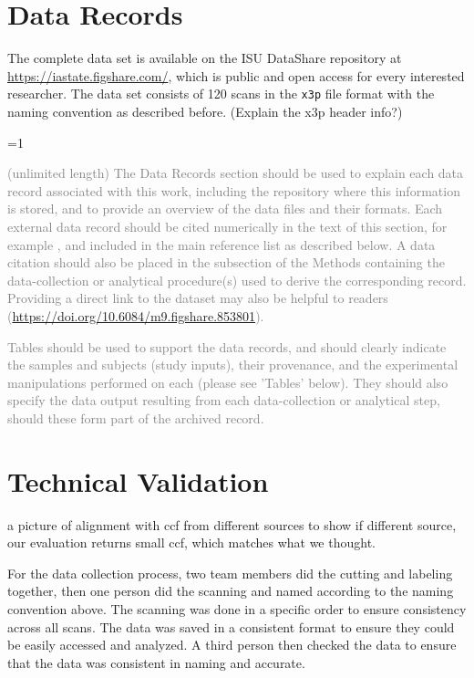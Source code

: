\documentclass[fleqn,10pt]{wlscirep}
\newcommand{\tom}[1]{{\textcolor{RedOrange}{#1}}}
\newcommand{\ifinstruction}{1} %
\begin{document}
\section{Data Records}\label{sec-data-records}

The complete data set is available on the ISU DataShare repository at
\href{https://iastate.figshare.com/}{https://iastate.figshare.com/},
which is public and open access for every interested researcher. The
data set consists of 120 scans in the \texttt{x3p} file format with the
naming convention as described before.
\tom{(Explain the x3p header info?)}

\ifnum \ifinstruction=1

\textcolor{gray}{(unlimited length) The Data Records section should be used to explain each data record associated with this work, including the repository where this information is stored, and to provide an overview of the data files and their formats. Each external data record should be cited numerically in the text of this section, for example \cite{Hao:gidmaps:2014}, and included in the main reference list as described below. A data citation should also be placed in the subsection of the Methods containing the data-collection or analytical procedure(s) used to derive the corresponding record. Providing a direct link to the dataset may also be helpful to readers (\hyperlink{https://doi.org/10.6084/m9.figshare.853801}{https://doi.org/10.6084/m9.figshare.853801}).}

\textcolor{gray}{Tables should be used to support the data records, and should clearly indicate the samples and subjects (study inputs), their provenance, and the experimental manipulations performed on each (please see 'Tables' below). They should also specify the data output resulting from each data-collection or analytical step, should these form part of the archived record.}
\fi

\section{Technical Validation}\label{sec-technical-validation}

\tom{a picture of alignment with ccf from different sources to show if different source, our evaluation returns small ccf, which matches what we thought.}

For the data collection process, two team members did the cutting and
labeling together, then one person did the scanning and named according
to the naming convention above. The scanning was done in a specific
order to ensure consistency across all scans. The data was saved in a
consistent format to ensure they could be easily accessed and analyzed.
A third person then checked the data to ensure that the data was
consistent in naming and accurate.
\end{document}
